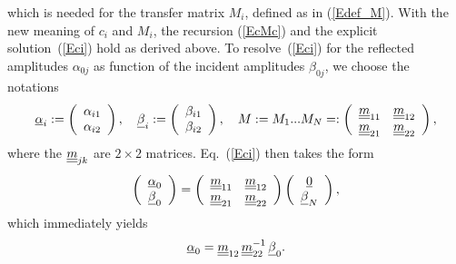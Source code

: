 which is needed for the transfer matrix $M_i$,
defined as in (\ref{Edef_M}).
With the new meaning of $c_i$ and $M_i$,
the recursion (\ref{EcMc}) and the explicit solution~(\ref{Eci})
hold as derived above.
To resolve~(\ref{Eci}) for the reflected amplitudes $\alpha_{0j}$
as function of the incident amplitudes $\beta_{0j}$,
we choose the notations
\begin{equation}
  \u\alpha_i
  :=\left(\begin{array}{c}\alpha_{i1}\\\alpha_{i2}\end{array}\right),\quad
  \u\beta_i
  :=\left(\begin{array}{c}\beta_{i1}\\\beta_{i2}\end{array}\right),\quad
  M:=M_1 ... M_N %
  =:\left(\begin{array}{cc}\uu m_{11}&\uu m_{12}\\
                           \uu m_{21}&\uu m_{22}\end{array}\right),
\end{equation}
where the $\underline{\underline{m}}_{jk}$ are $2\times2$ matrices.
Eq.~(\ref{Eci}) then takes the form
\begin{equation}
  \left(\begin{array}{c}\underline{\alpha}_{0}\\\underline{\beta}_{0}\end{array}\right)
  = 
  \left(\begin{array}{cc}\underline{\underline{m}}_{11}&\underline{\underline{m}}_{12}\\
    \underline{\underline{m}}_{21}&\underline{\underline{m}}_{22}\end{array}\right)
  \left(\begin{array}{c}\underline{0}\\\underline{\beta}_{N}\end{array}\right),
\end{equation}
which immediately yields
\begin{equation}
  \underline{\alpha}_0 = \underline{\underline{m}}_{12}\,\underline{\underline{m}}_{22}^{-1}\,\underline{\beta}_0.
\end{equation}
